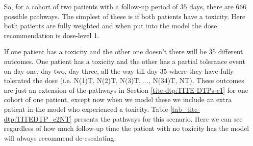 So, for a cohort of two patients with a follow-up period of 35 days, there are 666 possible pathways. The simplest of these is if both patients have a toxicity. Here both patients are fully weighted and when put into the model the dose recommendation is dose-level 1. 

If one patient has a toxicity and the other one doesn't there will be 35 different outcomes. One patient has a toxicity and the other has a partial tolerance event on day one, day two, day three, all the way till day 35 where they have fully tolerated the dose (i.e. N(1)T, N(2)T, N(3)T, ..., N(34)T, NT). These outcomes are just an extension of the pathways in Section \ref{tite-dtp:TITE-DTPs-c1} for one cohort of one patient, except now when we model these we include an extra patient in the model who experienced a toxicity. Table \ref{tab_tite-dtp:TITEDTP_c2NT} presents the pathways for this scenario. Here we can see regardless of how much follow-up time the patient with no toxicity has the model will always recommend de-escalating. 

